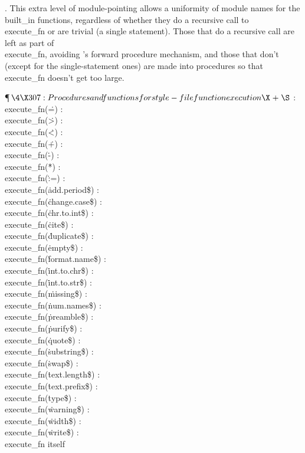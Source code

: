 .
This extra level of module-pointing allows a uniformity of module
names for the \\{built\_in} functions, regardless of whether they do a
recursive call to \\{execute\_fn} or are trivial (a single statement).
Those that do a recursive call are left as part of \\{execute\_fn},
avoiding \PASCAL's forward procedure mechanism, and those that don't
(except for the single-statement ones) are made into procedures so
that \\{execute\_fn} doesn't get too large.

\Y\P$\4\X307:Procedures and functions for style-file function execution\X%
\mathrel{+}\S$\6
:\\{execute\_fn}({\.{=}})\X\6
:\\{execute\_fn}({\.{>}})\X\6
:\\{execute\_fn}({\.{<}})\X\6
:\\{execute\_fn}({\.{+}})\X\6
:\\{execute\_fn}({\.{-}})\X\6
:\\{execute\_fn}({\.{*}})\X\6
:\\{execute\_fn}({\.{:=}})\X\6
:\\{execute\_fn}({\.{add.period\$}})\X\6
:\\{execute\_fn}({\.{change.case\$}})\X\6
:\\{execute\_fn}({\.{chr.to.int\$}})\X\6
:\\{execute\_fn}({\.{cite\$}})\X\6
:\\{execute\_fn}({\.{duplicate\$}})\X\6
:\\{execute\_fn}({\.{empty\$}})\X\6
:\\{execute\_fn}({\.{format.name\$}})\X\6
:\\{execute\_fn}({\.{int.to.chr\$}})\X\6
:\\{execute\_fn}({\.{int.to.str\$}})\X\6
:\\{execute\_fn}({\.{missing\$}})\X\6
:\\{execute\_fn}({\.{num.names\$}})\X\6
:\\{execute\_fn}({\.{preamble\$}})\X\6
:\\{execute\_fn}({\.{purify\$}})\X\6
:\\{execute\_fn}({\.{quote\$}})\X\6
:\\{execute\_fn}({\.{substring\$}})\X\6
:\\{execute\_fn}({\.{swap\$}})\X\6
:\\{execute\_fn}({\.{text.length\$}})\X\6
:\\{execute\_fn}({\.{text.prefix\$}})\X\6
:\\{execute\_fn}({\.{type\$}})\X\6
:\\{execute\_fn}({\.{warning\$}})\X\6
:\\{execute\_fn}({\.{width\$}})\X\6
:\\{execute\_fn}({\.{write\$}})\X\6
:\\{execute\_fn} itself\X\par
\fi


